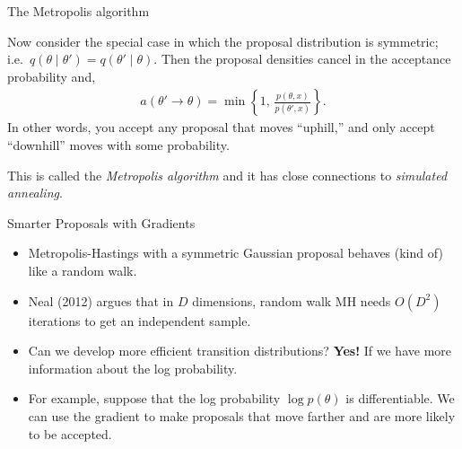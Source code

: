 \documentclass[aspectratio=169]{beamer}
\begin{document}
\begin{frame}[t,allowframebreaks]{The Metropolis algorithm}\label{the-metropolis-algorithm}

Now consider the special case in which the proposal distribution is
symmetric; i.e.~\(q(\theta \mid \theta') = q(\theta' \mid \theta)\).
Then the proposal densities cancel in the acceptance probability and,
\begin{align*}
a(\theta' \to \theta) = \min \left\{1, \, \frac{p(\theta, x)}{p(\theta', x)} \right \}.
\end{align*} In other words, you accept any proposal that moves
``uphill,'' and only accept ``downhill'' moves with some probability.

This is called the \emph{Metropolis algorithm} and it has close
connections to \emph{simulated annealing}.
\end{frame}

\begin{frame}[t,allowframebreaks]{Smarter Proposals with
Gradients}\label{smarter-proposals-with-gradients}

\begin{itemize}
\item
  Metropolis-Hastings with a symmetric Gaussian proposal behaves (kind
  of) like a random walk.
\item
  Neal (2012) argues that in \(D\) dimensions, random
  walk MH needs \(O(D^2)\) iterations to get an independent sample.
\item
  Can we develop more efficient transition distributions? \textbf{Yes!}
  If we have more information about the log probability.
\item
  For example, suppose that the log probability \(\log p(\theta)\) is
  differentiable. We can use the gradient to make proposals that move
  farther and are more likely to be accepted.
\end{itemize}
\end{frame}
\end{document}
